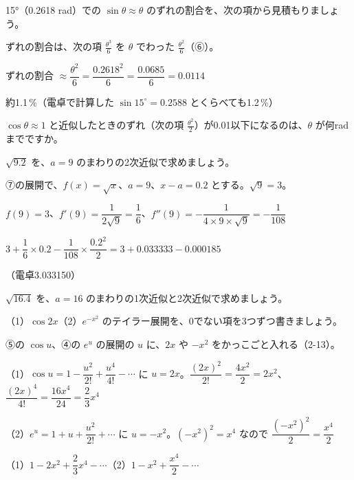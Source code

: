 \begin{reidai}[近似のずれを見積もる]
15°（0.2618 rad）での $\sin\theta\approx\theta$ のずれの割合を、次の項から見積もりましょう。\par
\kangaekata ずれの割合は、次の項 $\frac{\theta^3}{6}$ を $\theta$ でわった $\frac{\theta^2}{6}$（⑥）。\par
\shiki ずれの割合 $\approx\dfrac{\theta^2}{6}=\dfrac{0.2618^2}{6}=\dfrac{0.0685}{6}=0.0114$\par
\kotae 約1.1\,\%（電卓で計算した $\sin15^\circ=0.2588$ とくらべても1.2\,\%）
\end{reidai}

\begin{jibun}
$\cos\theta\approx1$ と近似したときのずれ（次の項 $\frac{\theta^2}{2}$）が0.01以下になるのは、$\theta$ が何radまでですか。
\end{jibun}

\begin{reidai}[$x=a$ のまわりの展開]
$\sqrt{9.2}$ を、$a=9$ のまわりの2次近似で求めましょう。\par
\kangaekata ⑦の展開で、$f(x)=\sqrt{x}$、$a=9$、$x-a=0.2$ とする。$\sqrt9=3$。\par
\shiki $f(9)=3$、$f'(9)=\dfrac{1}{2\sqrt9}=\dfrac{1}{6}$、$f''(9)=-\dfrac{1}{4\times9\times\sqrt9}=-\dfrac{1}{108}$\par
\hspace*{2.6\zw}$3+\dfrac{1}{6}\times0.2-\dfrac{1}{108}\times\dfrac{0.2^2}{2}=3+0.033333-0.000185$\par
{}（電卓3.033150）
\end{reidai}

\begin{jibun}
$\sqrt{16.4}$ を、$a=16$ のまわりの1次近似と2次近似で求めましょう。
\end{jibun}

\begin{reidai}[展開に式を入れる]
（1）$\cos2x$\quad（2）$e^{-x^2}$ のテイラー展開を、0でない項を3つずつ書きましょう。\par
\kangaekata ⑤の $\cos u$、④の $e^u$ の展開の $u$ に、$2x$ や $-x^2$ をかっこごと入れる（2-13）。\par
\shiki（1）$\cos u=1-\dfrac{u^2}{2!}+\dfrac{u^4}{4!}-\cdots$ に $u=2x$。$\dfrac{(2x)^2}{2!}=\dfrac{4x^2}{2}=2x^2$、$\dfrac{(2x)^4}{4!}=\dfrac{16x^4}{24}=\dfrac{2}{3}x^4$\par
\hspace*{2.6\zw}（2）$e^u=1+u+\dfrac{u^2}{2!}+\cdots$ に $u=-x^2$。$(-x^2)^2=x^4$ なので $\dfrac{(-x^2)^2}{2}=\dfrac{x^4}{2}$\par
\kotae （1）$1-2x^2+\dfrac{2}{3}x^4-\cdots$\quad（2）$1-x^2+\dfrac{x^4}{2}-\cdots$
\end{reidai}

